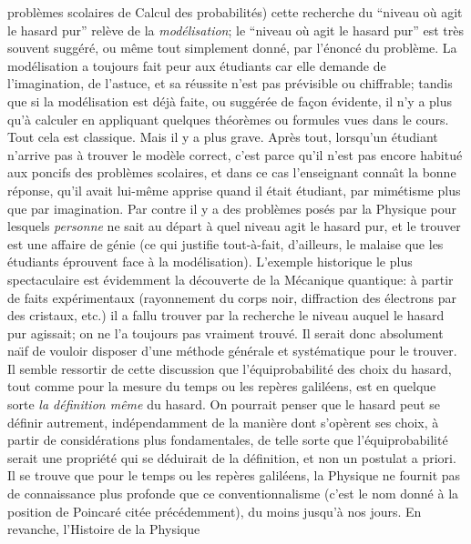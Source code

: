 probl\`emes scolaires de Calcul des probabilit\'es) cette recherche 
du ``niveau o\`u agit le hasard pur'' rel\`eve de la {\it mod\'elisation}; 
le  ``niveau o\`u agit le hasard pur'' est tr\`es souvent sugg\'er\'e, ou 
m\^eme tout simplement donn\'e, par  l'\'enonc\'e du probl\`eme.  
\medskip 
La mod\'elisation a toujours fait peur aux \'etudiants car elle demande 
de l'imagination, de l'astuce, et sa r\'eussite n'est pas pr\'evisible ou 
chiffrable; tandis que si la mod\'elisation est d\'ej\`a faite, ou 
sugg\'er\'ee de fa\c con \'evidente, il n'y a plus qu'\`a calculer en 
appliquant quelques th\'eor\`emes ou formules vues dans le cours. 
Tout cela est classique.  
\medskip  
Mais il y a plus grave. Apr\`es tout, lorsqu'un \'etudiant n'arrive pas 
\`a trouver le  mod\`ele correct, c'est parce qu'il n'est pas encore 
habitu\'e  aux poncifs  des probl\`emes scolaires, et dans ce cas  
l'enseignant conna{\^\i}t la bonne r\'eponse, qu'il avait lui-m\^eme  
apprise quand il \'etait \'etudiant, par mim\'etisme plus que par 
imagination. Par contre il y a des probl\`emes pos\'es par la Physique  
pour lesquels {\it personne} ne sait au d\'epart \`a quel niveau agit le 
hasard pur, et le trouver est une affaire de g\'enie (ce qui justifie 
tout-\`a-fait, d'ailleurs, le malaise que les \'etudiants \'eprouvent 
face \`a la mod\'elisation). L'exemple historique le plus spectaculaire 
est \'evidemment la d\'ecouverte de la M\'ecanique quantique: \`a 
partir de faits exp\'erimentaux (rayonnement du corps noir, 
diffraction des \'electrons par des cristaux, etc.) il a fallu trouver 
par la recherche le niveau auquel le hasard pur agissait; on ne 
l'a toujours pas vraiment trouv\'e. Il serait donc absolument na\"\i f 
de vouloir disposer d'une m\'ethode g\'en\'erale et syst\'ematique 
pour le trouver. 
\medskip 
Il semble ressortir de cette discussion que l'\'equiprobabilit\'e des 
choix du hasard, tout comme pour la mesure du temps ou les rep\`eres  
galil\'eens, est en quelque sorte {\it la d\'efinition m\^eme} du 
hasard. On pourrait penser que le hasard peut se d\'efinir autrement, 
ind\'ependamment de  la mani\`ere dont  s'op\`erent ses choix, \`a 
partir de consid\'erations plus fondamentales, de telle sorte que 
l'\'equiprobabilit\'e serait une propri\'et\'e qui se d\'eduirait de 
la d\'efinition, et non un postulat a priori. Il se trouve que pour le 
temps ou les rep\`eres galil\'eens, la Physique ne fournit pas de 
connaissance plus profonde que ce conventionnalisme (c'est le nom 
donn\'e \`a la position de Poincar\'e cit\'ee pr\'ec\'edemment), du 
moins jusqu'\`a nos jours. En revanche, l'Histoire de la Physique 
